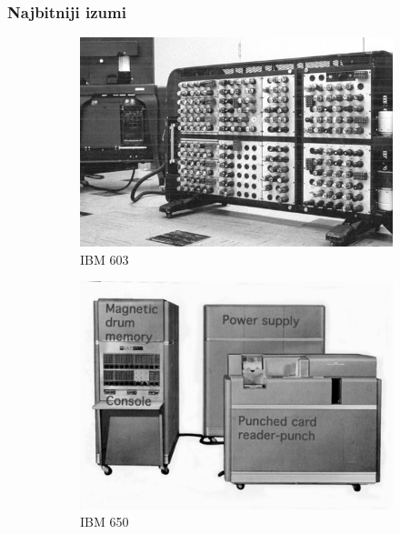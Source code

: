 \documentclass{beamer}
\begin{document}
\begin{frame}[fragile]\frametitle{Najbitniji izumi}
	\begin{figure}[htb]\captionsetup[subfigure]{labelformat=empty}
    \centering 
\begin{subfigure}{0.25\textwidth}
  \includegraphics[width=\linewidth]{ibm603.jpg}
  \caption{IBM 603}
  \label{fig:1}
\end{subfigure}\hfil
\begin{subfigure}{0.25\textwidth}
  \includegraphics[width=\linewidth]{ibm650.png}
  \caption{IBM 650}
  \label{fig:2}
\end{subfigure}\hfil
\begin{subfigure}{0.25\textwidth}

\end{subfigure}
\end{figure}
\end{frame}
\end{document}
